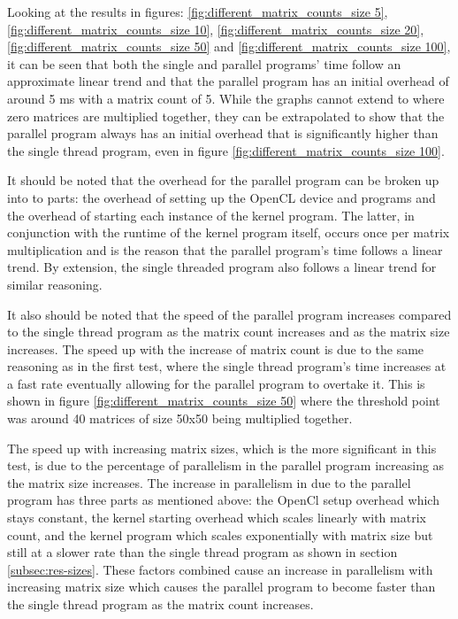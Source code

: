 Looking at the results in figures: \ref{fig:different_matrix_counts_size 5}, \ref{fig:different_matrix_counts_size 10}, \ref{fig:different_matrix_counts_size 20}, \ref{fig:different_matrix_counts_size 50} and \ref{fig:different_matrix_counts_size 100},
it can be seen that both the single and parallel programs' time follow an approximate linear trend and that the parallel program has an initial overhead of around 5 ms with a matrix count of 5.
While the graphs cannot extend to where zero matrices are multiplied together, they can be extrapolated to show that the parallel program always has an initial overhead that is significantly higher than the single thread program, even in figure \ref{fig:different_matrix_counts_size 100}.


It should be noted that the overhead for the parallel program can be broken up into to parts: the overhead of setting up the OpenCL device and programs and the overhead of starting each instance of the kernel program.
The latter, in conjunction with the runtime of the kernel program itself, occurs once per matrix multiplication and is the reason that the parallel program's time follows a linear trend.
By extension, the single threaded program also follows a linear trend for similar reasoning.


It also should be noted that the speed of the parallel program increases compared to the single thread program as the matrix count increases and as the matrix size increases.
The speed up with the increase of matrix count is due to the same reasoning as in the first test, where the single thread program's time increases at a fast rate eventually allowing for the parallel program to overtake it.
This is shown in figure \ref{fig:different_matrix_counts_size 50} where the threshold point was around 40 matrices of size 50x50 being multiplied together.


The speed up with increasing matrix sizes, which is the more significant in this test, is due to the percentage of parallelism in the parallel program increasing as the matrix size increases.
The increase in parallelism in due to the parallel program has three parts as mentioned above: the OpenCl setup overhead which stays constant, the kernel starting overhead which scales linearly with matrix count, and the kernel program which scales exponentially with matrix size but still at a slower rate than the single thread program as shown in section \ref{subsec:res-sizes}.
These factors combined cause an increase in parallelism with increasing matrix size which causes the parallel program to become faster than the single thread program as the matrix count increases.


